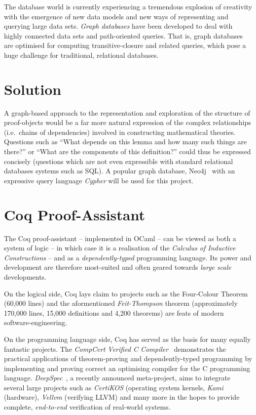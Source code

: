 The database world is currently experiencing a tremendous explosion of creativity
with the emergence of new data models and new ways of representing and querying
large data sets. \emph{Graph databases} have been developed to deal with highly
connected data sets and path-oriented queries. That is, graph databases are
optimised for computing transitive-closure and related queries, which pose a
huge challenge for traditional, relational databases.

\section{Solution}

A graph-based approach to the representation and exploration of the structure of
proof-objects would  be a far more natural expression of the complex
relationships (i.e.\ chains of dependencies) involved in
constructing mathematical theories. Questions such as ``What depends on this
lemma and how many such things are there?'' or ``What are the components of
this definition?'' could thus be expressed concisely (questions which are not
even expressible with standard relational databases systems such as
SQL). A popular graph database, Neo4j~\cite{neo4j} with an expressive query
language \emph{Cypher} will be used for this project.

\section{Coq Proof-Assistant}

The Coq proof-assistant -- implemented in OCaml -- can be viewed as both 
a system of logic -- in which case it is a realisation of the \emph{Calculus of
Inductive Constructions} -- and as a \emph{dependently-typed} programming
language. Its power and development are therefore most-suited and often geared
towards \emph{large scale} developments.

On the logical side, Coq lays claim to projects such as the Four-Colour
Theorem~\cite{gonthier2008formal} (60,000 lines) and the aformentioned
\emph{Feit-Thompson} theorem (approximately 170,000 lines, 15,000
definitions and 4,200 theorems) are feats of modern software-engineering.

On the programming language side, Coq has served as the basis for many equally
fantastic projects. The \emph{CompCert Verified C
Compiler}~\cite{leroy2012compcert} demonstrates the practical applications of
theorem-proving and dependently-typed programming by implementing and proving
correct an optimising compiler for the C programming language.
\emph{DeepSpec}~\cite{pierce2016science}, a recently announced meta-project,
aims to integrate several large projects such as \emph{CertiKOS} (operating
system kernels, \emph{Kami} (hardware), \emph{Vellvm} (verifying LLVM) and many
more in the hopes to provide complete, \emph{end-to-end} verification of
real-world systems.

